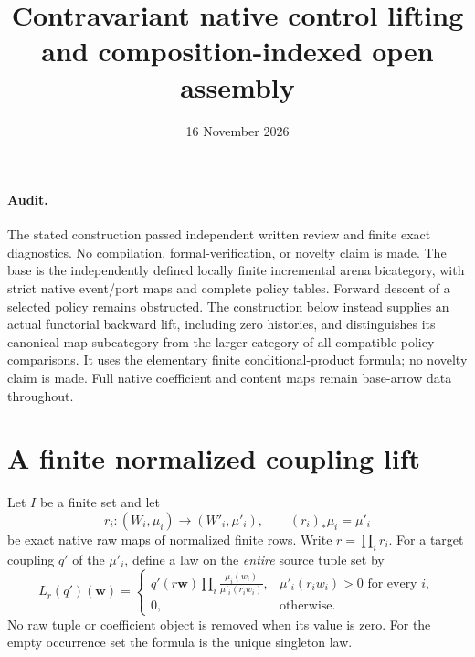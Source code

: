 \documentclass[11pt]{article}
\title{Contravariant native control lifting and composition-indexed open assembly}
\date{16 November 2026}
\begin{document}
\maketitle
\paragraph{Audit.} The stated construction passed independent written review and finite exact diagnostics. No compilation, formal-verification, or novelty claim is made. The base is the independently defined locally finite incremental arena bicategory, with strict native event/port maps and complete policy tables. Forward descent of a selected policy remains obstructed. The construction below instead supplies an actual functorial backward lift, including zero histories, and distinguishes its canonical-map subcategory from the larger category of all compatible policy comparisons. It uses the elementary finite conditional-product formula; no novelty claim is made. Full native coefficient and content maps remain base-arrow data throughout.

\section{A finite normalized coupling lift}
Let $I$ be a finite set and let
\[
 r_i:(W_i,\mu_i)\to(W'_i,\mu'_i),\qquad(r_i)_*\mu_i=\mu'_i
\]
be exact native raw maps of normalized finite rows. Write $r=\prod_i r_i$. For a target coupling $q'$ of the $\mu'_i$, define a law on the \emph{entire} source tuple set by
\[
 L_r(q')(\mathbf w)=
 \begin{cases}
 q'(r\mathbf w)\displaystyle\prod_i
 \frac{\mu_i(w_i)}{\mu'_i(r_iw_i)},&\mu'_i(r_iw_i)>0\text{ for every }i,\\
 0,&\text{otherwise}.
 \end{cases}\tag{1}
\]
No raw tuple or coefficient object is removed when its value is zero. For the empty occurrence set the formula is the unique singleton law.
\end{document}
